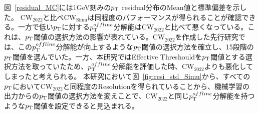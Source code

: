 図~\ref{residual_MC}には1GeV刻みの$p_{\rm{T}}$ residual分布のMean値と標準偏差を示した。
$\mathrm{CW_{2022}}$と比べ$\mathrm{CW_{Simu}}$は同程度のパフォーマンスが得られることが確認できる。一方で低い$p_{\rm{T}}$に対する$p_{\rm{T}}^{offline}$分解能は$\mathrm{CW_{2022}}$と比べて悪くなっている。これは、$p_{\rm{T}}$閾値の選択方法の影響が表れている。$\mathrm{CW_{2022}}$を作成した先行研究では、この$p_{\rm{T}}^{offline}$分解能が向上するような$p_{\rm{T}}$閾値の選択方法を確立し、15段階の$p_{\rm{T}}$閾値を選んでいた。一方、本研究ではEffective Threshouldを$p_{\rm{T}}$閾値とする選択方法を取っていたため、$p_{\rm{T}}^{offline}$分解能を評価した時、$\mathrm{CW_{2022}}$よりも悪化してしまったと考えられる。
本研究において図~\ref{fig:resi_std_Simu}から、すべての$p_{\rm{T}}$において$\mathrm{CW_{2022}}$と同程度のResolutionを得られていることから、機械学習の出力からの$p_{\rm{T}}$閾値の選択方法を変えことで、$\mathrm{CW_{2022}}$と同じ$p_{\rm{T}}^{offline}$分解能を持つような$p_{\rm{T}}$閾値を設定できると見込まれる。


